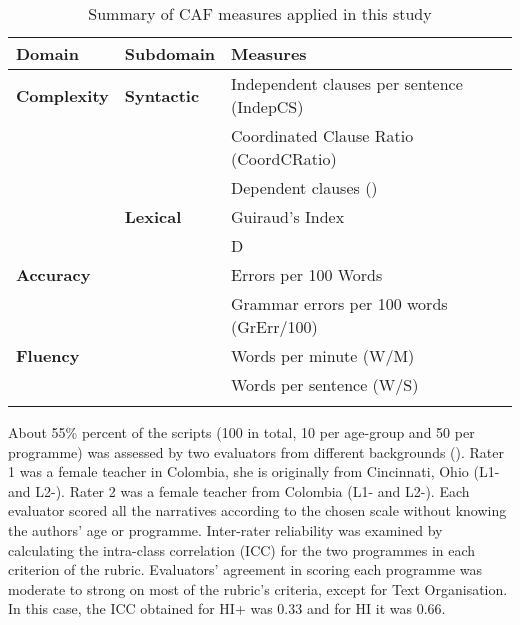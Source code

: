 \documentclass[output=paper]{langsci/langscibook}
\begin{document}
\begin{table}
\begin{tabularx}{\textwidth}{llQ}
\lsptoprule
\bfseries Domain & \bfseries Subdomain & \bfseries Measures\\
\midrule
\bfseries Complexity & \bfseries Syntactic & Independent clauses per sentence (IndepCS)\\
&  & Coordinated Clause Ratio (CoordCRatio)\\
&  & Dependent clauses ()\\
\tablevspace
& \bfseries Lexical & Guiraud’s Index\\
&  & D\\
\tablevspace
\bfseries Accuracy &  & Errors per 100 Words\\
&  & Grammar errors per 100 words (GrErr/100)\\
\tablevspace
\bfseries Fluency &  & Words per minute (W/M)\\
&  & Words per sentence (W/S)\\
\lspbottomrule
\end{tabularx}
\caption{Summary of CAF measures applied in this study}
\label{tab:tejada:4}
\end{table}


About 55\% percent of the scripts (100 in total, 10 per age-group and 50 per programme) was assessed by two evaluators from different backgrounds (). Rater 1 was a female  teacher in Colombia, she is originally from Cincinnati, Ohio (L1- and L2-). Rater 2 was a female  teacher from Colombia (L1- and L2-). Each evaluator scored all the narratives according to the chosen scale without knowing the authors’ age or programme. Inter-rater reliability was examined by calculating the intra-class correlation (ICC) for the two programmes in each criterion of the rubric. Evaluators’ agreement in scoring each  programme was moderate to strong on most of the rubric’s criteria, except for Text Organisation. In this case, the ICC obtained for HI+ was 0.33 and for HI it was 0.66.  
\end{document}
